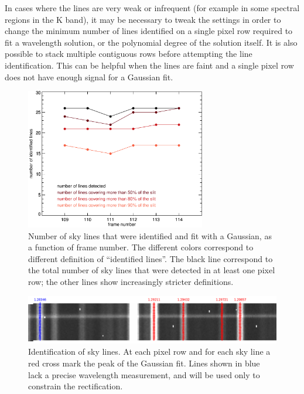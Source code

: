 \documentclass[a4paper]{article}
\begin{document}
\begin{sloppypar}
In cases where the lines are very weak or infrequent (for example in some spectral regions in the K band), it may be necessary to tweak the settings in order to change the minimum number of lines identified on a single pixel row required to fit a wavelength solution, or the polynomial degree of the solution itself. It is also possible to stack multiple contiguous rows before attempting the line identification. This can be helpful when the lines are faint and a single pixel row does not have enough signal for a Gaussian fit.


\begin{figure}[tbp]
\centering
\includegraphics[width=0.7\textwidth]{number_lines}
\caption{Number of sky lines that were identified and fit with a Gaussian, as a function of frame number. The different colors correspond to different definition of ``identified lines''. The black line correspond to the total number of sky lines that were detected in at least one pixel row; the other lines show increasingly stricter definitions.}
\label{fig:number_lines}
\end{figure}


\begin{figure}[tbp]
\centering
\includegraphics[width=\textwidth]{speclines.png}
\caption{Identification of sky lines. At each pixel row and for each sky line a red cross mark the peak of the Gaussian fit. Lines shown in blue lack a precise wavelength measurement, and will be used only to constrain the rectification.}
\label{fig:speclines}
\end{figure}



\end{sloppypar}
\end{document}
